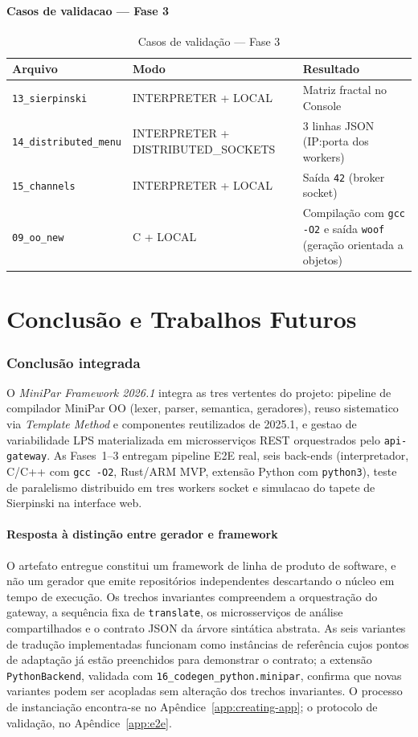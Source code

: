 \documentclass[12pt]{article}
\begin{document}
\subsection{Casos de validacao --- Fase 3}
\begin{table}[htbp]
\centering
\small
\caption{Casos de validação --- Fase 3}
\label{tab:fase3}
\begin{tabularx}{\textwidth}{|Y|Y|Y|}
\hline
\textbf{Arquivo} & \textbf{Modo} & \textbf{Resultado} \\
\hline
\texttt{13\_sierpinski} & INTERPRETER + LOCAL & Matriz fractal no Console \\
\texttt{14\_distributed\_menu} & INTERPRETER + DISTRIBUTED\_SOCKETS & 3 linhas JSON (IP:porta dos workers) \\
\texttt{15\_channels} & INTERPRETER + LOCAL & Saída \texttt{42} (broker socket) \\
\texttt{09\_oo\_new} & C + LOCAL & Compilação com \texttt{gcc -O2} e saída \texttt{woof} (geração orientada a objetos) \\
\hline
\end{tabularx}
\end{table}

\part{Conclusão e Trabalhos Futuros}

\section{Conclusão integrada}
O \emph{MiniPar Framework 2026.1} integra as tres vertentes do projeto: pipeline de compilador MiniPar OO (lexer, parser, semantica, geradores), reuso sistematico via \emph{Template Method} e componentes reutilizados de 2025.1, e gestao de variabilidade LPS materializada em microsserviços REST orquestrados pelo \texttt{api-gateway}. As Fases~1--3 entregam pipeline E2E real, seis back-ends (interpretador, C/C++ com \texttt{gcc -O2}, Rust/ARM MVP, extensão Python com \texttt{python3}), teste de paralelismo distribuido em tres workers socket e simulacao do tapete de Sierpinski na interface web.

\subsection{Resposta à distinção entre gerador e framework}
O artefato entregue constitui um framework de linha de produto de software, e não um gerador que emite repositórios independentes descartando o núcleo em tempo de execução. Os trechos invariantes compreendem a orquestração do gateway, a sequência fixa de \texttt{translate}, os microsserviços de análise compartilhados e o contrato JSON da árvore sintática abstrata. As seis variantes de tradução implementadas funcionam como instâncias de referência cujos pontos de adaptação já estão preenchidos para demonstrar o contrato; a extensão \texttt{PythonBackend}, validada com \texttt{16\_codegen\_python.minipar}, confirma que novas variantes podem ser acopladas sem alteração dos trechos invariantes. O processo de instanciação encontra-se no Apêndice~\ref{app:creating-app}; o protocolo de validação, no Apêndice~\ref{app:e2e}.
\end{document}
